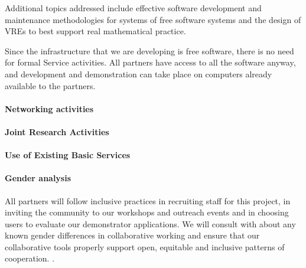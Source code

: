 
Additional topics addressed include effective software development and
maintenance methodologies for systems of free software systems and the
design of VREs to best support real mathematical practice.

Since the infrastructure that we are developing is free software,
there is no need for formal Service activities. All partners have
access to all the software anyway, and development and demonstration
can take place on computers already available to the partners. 

\paragraph{Networking activities}

\paragraph{Joint Research Activities}

\paragraph{Use of Existing Basic Services}

\paragraph{Gender analysis}

All partners will follow inclusive practices in recruiting staff for
this project, in inviting the community to our workshops and outreach
events and in choosing users to evaluate our demonstrator
applications. We will consult with  about any known gender differences in
collaborative working and ensure that our collaborative tools properly
support open, equitable and inclusive patterns of cooperation. 
.


